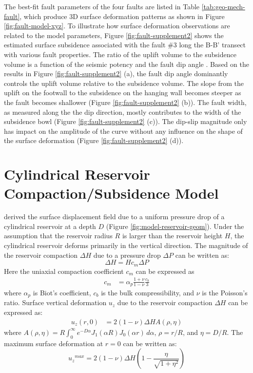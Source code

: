 \documentclass[draft,grl]{agutexSI2019}
\begin{document}
\begin{article}
The best-fit fault parameters of the four faults are listed in Table \ref{tab:geo-mech-fault}, which produce 3D surface deformation patterns as shown in Figure \ref{fig:fault-model-xyz}. To illustrate how surface deformation observations are related to the model parameters, Figure \ref{fig:fault-supplement2} shows the estimated surface subsidence associated with the fault \#3 long the B-B' transect with various fault properties. The ratio of the uplift volume to the subsidence volume is a function of the seismic potency and the fault dip angle \cite{Segall2019integrated}. Based on the results in Figure \ref{fig:fault-supplement2} (a), the fault dip angle dominantly controls the uplift volume relative to the subsidence volume. The slope from the uplift on the footwall to the subsidence on the hanging wall becomes steeper as the fault becomes shallower (Figure \ref{fig:fault-supplement2} (b)). The fault width, as measured along the the dip direction, mostly contributes to the width of the subsidence bowl (Figure \ref{fig:fault-supplement2} (c)).  The dip-slip magnitude only has impact on the amplitude of the curve without any influence on the shape of the surface deformation (Figure \ref{fig:fault-supplement2} (d)).



\section{ Cylindrical Reservoir Compaction/Subsidence Model}
\label{sec:model-compact}
 derived the surface displacement field due to a uniform pressure drop of a cylindrical reservoir at a depth $D$ (Figure \ref{fig:model-reservoir-geom}). Under the assumption that the reservoir radius $R$ is larger than the reservoir height $H$, the cylindrical reservoir deforms primarily in the vertical direction. The magnitude of the reservoir compaction $\Delta H$ due to a pressure drop $\Delta P$ can be written as:
\begin{equation}
    \Delta H = H c_m \Delta P
\label{eq:rcompact}
\end{equation}
Here the  uniaxial compaction coefficient $c_m$ can be expressed as
\begin{align}
    c_{m} &= \alpha_{p}\frac{1+\nu}{1-\nu}\frac{c_{b}}{3} 
\end{align}
where $\alpha_p$ is Biot's coefficient, $c_b$ is the bulk compressibility, and $\nu$ is the Poisson's ratio. Surface vertical deformation $u_z$ due to the reservoir compaction $\Delta H$ can be expressed as:
\begin{align}
    u_{z}(r,0) &= 2(1-\nu)\Delta HA(\rho,\eta) 
    \label{eq:reservoirDef}
\end{align}
where $ A(\rho,\eta) = R\int_{0}^{\infty}e^{-D\alpha}J_{1}(\alpha R)J_{0}(\alpha r) \, d\alpha$, $\rho = r/R$, and $\eta =  D/R$. The maximum surface deformation at $r = 0$ can be written as:
\begin{equation}
    {u_{z}}^{max} = 2(1-\nu)\Delta H(1-\frac{\eta}{\sqrt{1+\eta^{2}}})
\end{equation}


\end{article}
\end{document}
